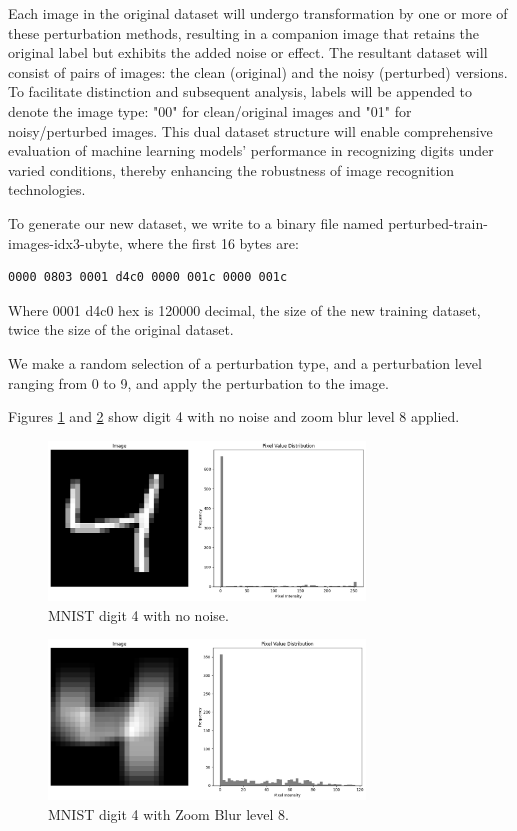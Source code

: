Each image in the original dataset will undergo transformation by one or more of these perturbation methods, resulting in a companion image that retains the original label but exhibits the added noise or effect. The resultant dataset will consist of pairs of images: the clean (original) and the noisy (perturbed) versions. To facilitate distinction and subsequent analysis, labels will be appended to denote the image type: "00" for clean/original images and "01" for noisy/perturbed images. This dual dataset structure will enable comprehensive evaluation of machine learning models' performance in recognizing digits under varied conditions, thereby enhancing the robustness of image recognition technologies.


To generate our new dataset, we write to a binary file named perturbed-train-images-idx3-ubyte, where the first 16 bytes are:
\begin{verbatim}
0000 0803 0001 d4c0 0000 001c 0000 001c    
\end{verbatim}
Where 0001 d4c0 hex is 120000 decimal, the size of the new training dataset, twice the size of the original dataset.

We make a random selection of a perturbation type, and a perturbation level ranging from 0 to 9, and apply the perturbation to the image.

Figures \ref{fig:MNIST_4_clean_with_histogram} and \ref{fig:MNIST_4_noisy_with_histogram} show digit 4 with no noise and zoom blur level 8 applied.
\begin{figure}[h]
    \centering
    \includegraphics[width=0.75\textwidth]{Figures/Methods/MNIST_4_clean_with_histogram.png}
    \caption{MNIST digit 4 with no noise.}
    \label{fig:MNIST_4_clean_with_histogram}
\end{figure}

\begin{figure}[h]
    \centering
    \includegraphics[width=0.75\textwidth]{Figures/Methods/MNIST_4_noisy_with_histogram.png}
    \caption{MNIST digit 4 with Zoom Blur level 8.}
    \label{fig:MNIST_4_noisy_with_histogram}
\end{figure}


